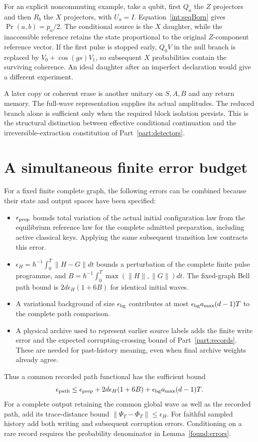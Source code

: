 \documentclass[11pt,oneside,openany]{book}
\theoremstyle{definition}
\theoremstyle{remark}\newtheorem{remark}[theorem]{Remark}
\begin{document}
For an explicit noncommuting example, take a qubit, first $Q_a$ the $Z$ projectors and then $R_b$ the $X$ projectors, with $U_a=I$. Equation~\eqref{int:seqBorn} gives $\Pr(a,b)=p_a/2$. The conditional source is the $X$ daughter, while the inaccessible reference retains the state proportional to the original $Z$-component reference vector. If the first pulse is stopped early, $Q_0V$ in the null branch is replaced by $V_0+\cos(gs)V_1$, so subsequent $X$ probabilities contain the surviving coherence. An ideal daughter after an imperfect declaration would give a different experiment.

A later copy or coherent erase is another unitary on $S,A,B$ and any return memory. The full-wave representation supplies its actual amplitudes. The reduced branch alone is sufficient only when the required block isolation persists. This is the structural distinction between effective conditional continuation and the irreversible-extraction constitution of Part~\ref{part:detectors}.

\section{A simultaneous finite error budget}\label{int:budget}
For a fixed finite complete graph, the following errors can be combined because their state and output spaces have been specified:
\begin{itemize}
\item $\epsilon_{\rm prep}$ bounds total variation of the actual initial configuration law from the equilibrium reference law for the complete admitted preparation, including active classical keys. Applying the same subsequent transition law contracts this error.
\item $\epsilon_H=\hbar^{-1}\int_0^T\|H-G\|dt$ bounds a perturbation of the complete finite pulse programme, and $B=\hbar^{-1}\int_0^T\max(\|H\|,\|G\|)dt$. The fixed-graph Bell path bound is $2d\epsilon_H(1+6B)$ for identical initial waves.
\item A variational background of size $\epsilon_{\rm bg}$ contributes at most $\epsilon_{\rm bg}a_{\max}(d-1)T$ to the complete path comparison.
\item A physical archive used to represent earlier source labels adds the finite write error and the expected corrupting-crossing bound of Part~\ref{part:records}. These are needed for past-history meaning, even when final archive weights already agree.
\end{itemize}
Thus a common recorded path functional has the sufficient bound
\begin{equation}\label{int:budget-eq}
 \epsilon_{\rm path}\le\epsilon_{\rm prep}
   +2d\epsilon_H(1+6B)
   +\epsilon_{\rm bg}a_{\max}(d-1)T.
\end{equation}
For a complete output retaining the common global wave as well as the recorded path, add its trace-distance bound $\|\Psi_T-\Phi_T\|\le\epsilon_H$. For faithful sampled history add both writing and subsequent corruption errors. Conditioning on a rare record requires the probability denominator in Lemma~\ref{found:errors}.
\end{document}

